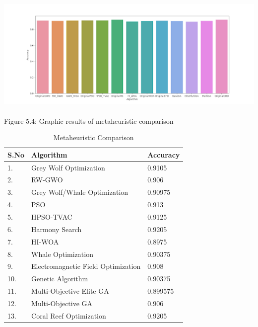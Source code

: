 \begin{center}
   \includegraphics[width=7in, height=2.5in]{images/5.4.png} 
   \\\fontsize{11pt}{24pt}	Figure 5.4: Graphic results of metaheuristic comparison
\end{center}
\begin{table}[H]
\begin{center}
\begin{tabular}{|p{1cm}|p{4cm}|p{2cm}|}
\hline
S.No & Algorithm           & Accuracy\\ \hline
1.   & Grey Wolf Optimization & 0.9105          \\ \hline
2.   & RW-GWO      & 0.906          \\ \hline
3.   & Grey Wolf/Whale Optimization      & 0.90975          \\ \hline
4.   & PSO     & 0.913         \\ \hline
5.   & HPSO-TVAC     & 0.9125          \\ \hline
6.   & Harmony Search     & 0.9205          \\ \hline
7.   & HI-WOA     & 0.8975          \\ \hline
8.   & Whale Optimization     & 0.90375          \\ \hline
9.   & Electromagnetic Field Optimization     & 0.908          \\ \hline
10.   & Genetic Algorithm     & 0.90375          \\ \hline
11.   & Multi-Objective Elite GA     & 0.899575          \\ \hline
12.   & Multi-Objective GA     & 0.906          \\ \hline
13.   & Coral Reef Optimization     & 0.9205          \\ \hline
\end{tabular}
\end{center}
\caption{Metaheuristic Comparison}
\end{table}

